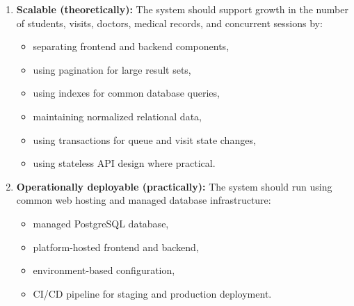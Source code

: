 \documentclass[11pt,a4paper]{article}
\begin{document}
\begin{enumerate}

    \item \textbf{Scalable (theoretically):} The system should support growth in the number of students, visits, doctors, medical records, and concurrent sessions by:

    \begin{itemize}

        \item separating frontend and backend components,

        \item using pagination for large result sets,

        \item using indexes for common database queries,

        \item maintaining normalized relational data,

        \item using transactions for queue and visit state changes,

        \item using stateless API design where practical.

    \end{itemize}

    \item \textbf{Operationally deployable (practically):} The system should run using common web hosting and managed database infrastructure:

    \begin{itemize}

        \item managed PostgreSQL database,

        \item platform-hosted frontend and backend,

        \item environment-based configuration,

        \item CI/CD pipeline for staging and production deployment.

    \end{itemize}

\end{enumerate}

\end{document}
